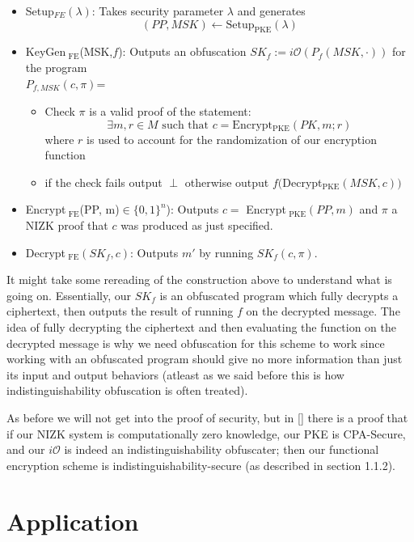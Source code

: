 \documentclass[12pt,twoside]{reedthesis}
\begin{document}
    \begin{itemize}
    \item Setup$_{ FE}(\lambda)$: Takes security parameter $\lambda$ and generates
     $$(PP, MSK) \leftarrow \text{Setup}_{\text{PKE}}(\lambda)$$
     \item KeyGen$_\text{ FE}$(MSK,$f$): Outputs an obfuscation $SK_f := i\mathcal{O}(P_f(MSK, \cdot))$ for the program 
     \\ $P_{f,MSK}(c,\pi)$=
     \begin{itemize}
     \item Check $\pi$ is a valid proof of the statement: $$ \text{$\exists m,r \in M$ such that $c =$Encrypt$_\text{PKE}(PK,m;r)$}$$ where $r$ is used to account for the randomization of our encryption function
     \item if the check fails output $\perp$ otherwise output $f($Decrypt$_\text{PKE}(MSK,c))$
     \end{itemize}
     \item Encrypt$_\text{ FE}$(PP, m)$\in \{ 0,1 \}^n$): Outputs $c =$ Encrypt$_\text{ PKE}(PP, m)$ and $\pi$ a NIZK proof that $c$ was produced as just specified.
     \item Decrypt$_\text{ FE}(SK_f,c)$: Outputs $m'$ by running $SK_f(c,\pi)$.

    
    \end{itemize}
    \par It might take some rereading of the construction above to understand what is going on. Essentially, our $SK_f$ is an obfuscated program which fully decrypts a ciphertext, then outputs the result of running $f$ on the decrypted message. The idea of fully decrypting the ciphertext and then evaluating the function on the decrypted message is why we need obfuscation for this scheme to work since working with an obfuscated program should give no more information than just its input and output behaviors (atleast as we said before this is how indistinguishability obfuscation is often treated). 
    \par As before we will not get into the proof of security, but in [\cite{Garg:2013}] there is a proof that if our NIZK system is computationally zero knowledge, our PKE is CPA-Secure, and our $i\mathcal{O}$ is indeed an indistinguishability obfuscater; then our functional encryption scheme is indistinguishability-secure (as described in section 1.1.2).
    
    
    \section{Application}
    
\end{document}
